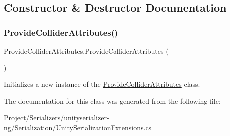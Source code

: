 \subsection{Constructor \& Destructor Documentation}
\mbox{\label{class_provide_collider_attributes_ae73c8b0cca5d8c1d42d7e7539eae6504}} 
\subsubsection{\texorpdfstring{Provide\+Collider\+Attributes()}{ProvideColliderAttributes()}}
{\footnotesize\ttfamily Provide\+Collider\+Attributes.\+Provide\+Collider\+Attributes (\begin{DoxyParamCaption}{ }\end{DoxyParamCaption})\hspace{0.3cm}{\ttfamily [inline]}}



Initializes a new instance of the \hyperlink{class_provide_collider_attributes}{Provide\+Collider\+Attributes} class. 



The documentation for this class was generated from the following file\+:\begin{DoxyCompactItemize}
\item 
Project/\+Serializers/unityserializer-\/ng/\+Serialization/Unity\+Serialization\+Extensions.\+cs\end{DoxyCompactItemize}

